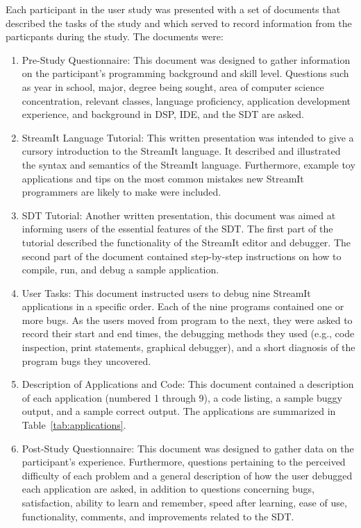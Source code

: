 \documentclass[11pt, letterpaper, onecolumn]{article}
\begin{document}
Each participant in the user study was presented with a  set of
documents that described the tasks of the study and which served to
record information from the particpants during the study. The
documents were:
\begin{enumerate}
\item Pre-Study  Questionnaire: This  document was designed  to gather
information  on  the participant's  programming  background and  skill
level. Questions such  as year in school, major,  degree being sought,
area  of computer  science concentration,  relevant  classes, language
proficiency,  application development  experience,  and background  in
DSP, IDE, and the SDT are asked.
\item  StreamIt  Language  Tutorial:  This  written  presentation  was
intended to give  a cursory introduction to the  StreamIt language. It
described  and illustrated the  syntax and  semantics of  the StreamIt
language. Furthermore,  example toy applications and tips  on the most
common  mistakes new  StreamIt  programmers are  likely  to make  were
included.
\item SDT  Tutorial: Another  written presentation, this  document was
aimed at  informing users  of the essential  features of the  SDT. The
first part of the tutorial described the functionality of the StreamIt
editor  and  debugger.  The  second  part of  the  document  contained
step-by-step instructions on  how to compile, run, and  debug a sample
application.
\item  User  Tasks:  This  document  instructed users  to  debug  nine
StreamIt applications in  a specific order. Each of  the nine programs
contained one  or more bugs.  As  the users moved from  program to the
next,  they  were asked  to  record their  start  and  end times,  the
debugging methods they used  (e.g., code inspection, print statements,
graphical debugger),  and a short  diagnosis of the program  bugs they
uncovered.
\item Description of Applications  and Code: This document contained a
description  of  each  application  (numbered  1 through  9),  a  code
listing, a sample buggy output, and a sample correct output. The
applications are summarized in Table~\ref{tab:applications}.
\item Post-Study  Questionnaire: This document was  designed to gather
data   on  the   participant's   experience.  Furthermore,   questions
pertaining to the  perceived difficulty of each problem  and a general
description of  how the user  debugged each application are  asked, in
addition to questions concerning  bugs, satisfaction, ability to learn
and  remember,  speed  after  learning, ease  of  use,  functionality,
comments, and improvements related to the SDT.
\end{enumerate}
\end{document}
